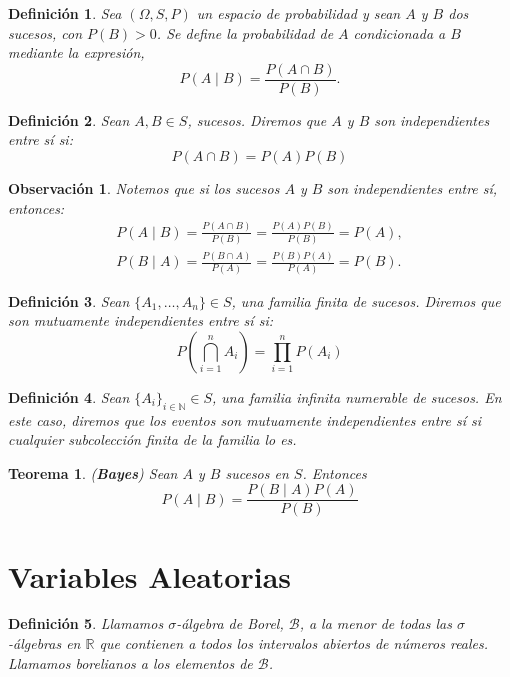 \documentclass{report}
\newtheorem{thm}{Teorema}[section]
\newtheorem{dfn}{Definición}[section]
\newtheorem{obs}{Observación}[section]
\begin{document}
\begin{dfn}
Sea \( (\Omega, S, P) \) un espacio de probabilidad y sean \( A \) y \( B \) dos sucesos, con \( P(B) > 0 \).
Se define la probabilidad de \( A \) condicionada a \( B \) mediante la expresión,
\[
P(A \mid B) = \frac{P(A \cap B)}{P(B)}.
\]
\end{dfn}

\begin{dfn}
Sean $A, B\in S$, sucesos. Diremos que $A$ y $B$ son \emph{independientes} entre sí si:
$$
P(A\cap B) = P(A)P(B)
$$
\end{dfn}

\begin{obs}
    Notemos que si los sucesos $A$ y $B$ son independientes entre sí, entonces:
    \[
    \begin{split}
        P(A \mid B) =  \frac{P(A \cap B)}{P(B)} =\frac{P(A)P(B)}{P(B)} = P(A),\\
        P(B \mid A) =  \frac{P(B \cap A)}{P(A)} =\frac{P(B)P(A)}{P(A)} = P(B).
    \end{split}
    \]
\end{obs}

\begin{dfn}
Sean $\{A_1, \ldots, A_n\}\in S$, una familia finita de sucesos. Diremos que son \emph{mutuamente independientes} entre sí si:
$$
P\left(\bigcap_{i=1}^n A_i \right) = \prod_{i=1}^{n} P(A_i)
$$
\end{dfn}

\begin{dfn}
Sean $\{A_i\}_{i\in\mathbb{N}}\in S$, una familia infinita numerable de sucesos. En este caso, diremos que los eventos son mutuamente
independientes entre sí si cualquier subcolección finita de la familia lo es.
\end{dfn}

\begin{thm}(\textbf{Bayes})
Sean $A$ y $B$ sucesos en $S$. Entonces
\begin{equation*}
    P(A\mid B) = \frac{P(B\mid A)P(A)}{P(B)}
\end{equation*}
\end{thm}

\section{Variables Aleatorias}

\begin{dfn}
    Llamamos $\sigma$-álgebra de Borel, $\mathcal{B}$, a la menor de todas las $\sigma$-álgebras en $\mathbb{R}$ que contienen a todos los intervalos
    abiertos de números reales. Llamamos \emph{borelianos} a los elementos de $\mathcal{B}$.
\end{dfn}
\end{document}
